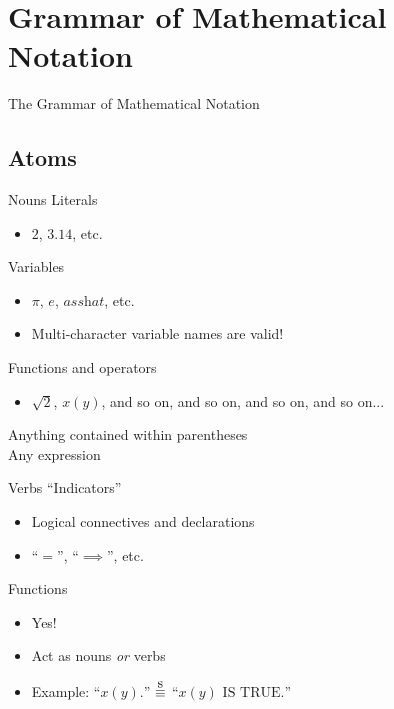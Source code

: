 \documentclass{beamer}
\newcommand{\sequiv}{\stackrel{\mathclap{\normalfont\mbox{s}}}{\equiv}}
\begin{document}
	\section{Grammar of Mathematical Notation}
		\begin{frame}
			\begin{center}
				The Grammar of Mathematical Notation
			\end{center}
		\end{frame}
			\subsection{Atoms}
				\begin{frame}{Nouns}
					Literals
					\begin{itemize}
						\item $2$, $3.14$, etc.
					\end{itemize}
					Variables
					\begin{itemize}
						\item $\pi$, $e$, $\textit{asshat}$, etc.
						\item Multi-character variable names are valid!
					\end{itemize}
					Functions and operators
					\begin{itemize}
						\item $\sqrt{2}$, $x\left(y\right)$,
            and so on, and so on, and so on, and so on...
					\end{itemize}
					Anything contained within parentheses\\
					Any expression
				\end{frame}
				\begin{frame}{Verbs}
					``Indicators''
					\begin{itemize}
						\item Logical connectives and declarations
						\item ``$=$'', ``$\implies$'', etc.
					\end{itemize}
					Functions
					\begin{itemize}
						\item Yes!
						\item Act as nouns \textit{or} verbs
						\item Example: ``$x\left(y\right).$'' $\sequiv$
              ``$x\left(y\right) \textrm{ IS TRUE}.$''
					\end{itemize}
				\end{frame}
\end{document}
